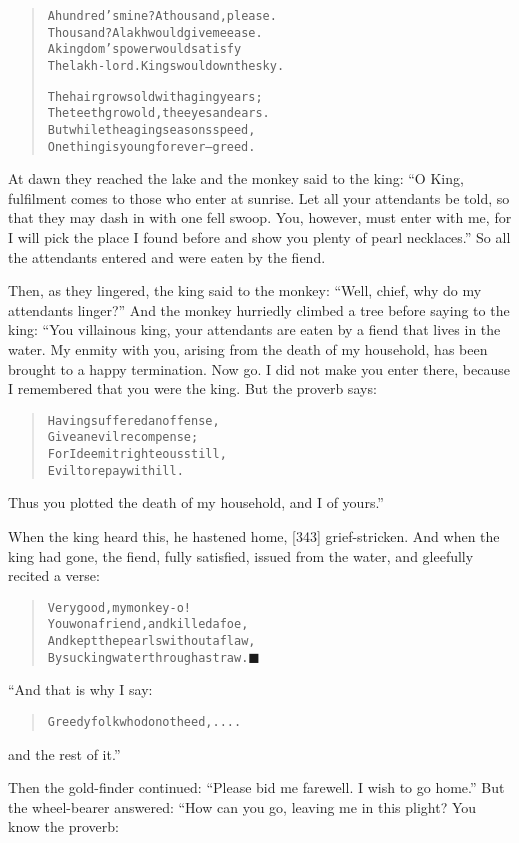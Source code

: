 \documentclass[article, twoside, 14pt]{memoir}
\newcommand{\qed}{\hfill \ensuremath{\blacksquare}}
\renewenvironment{verbatim}{%
\begin{quote}%
\vskip -10pt%
\begin{alltt}\normalfont\large}{\end{alltt}%
\end{quote}%
\vskip -10pt
} %
\begin{document}
\begin{verbatim}
A hundred's mine? A thousand, please.
Thousand? A lakh would give me ease.
A kingdom's power would satisfy
The lakh-lord. Kings would own the sky.

The hair grows old with aging years;
The teeth grow old, the eyes and ears.
But while the aging seasons speed,
One thing is young forever--greed.
\end{verbatim}
At dawn they reached the lake and the monkey said to the king:
``O King, fulfilment comes to those who enter at sunrise. Let all your attendants be told, so that they may dash in with one fell swoop. You, however, must enter with me, for I will pick the place I found before and show you plenty of pearl necklaces.''
So all the attendants entered and were eaten by the fiend.

Then, as they lingered, the king said to the monkey:
``Well, chief, why do my attendants linger?'' And the monkey
hurriedly climbed a tree before saying to the king: “You villainous
king, your attendants are eaten by a fiend that lives in the water.
My enmity with you, arising from the death of my household, has
been brought to a happy termination. Now go. I did not make you
enter there, because I remembered that you were the king. But the
proverb says:

\begin{verbatim}
Having suffered an offense,
Give an evil recompense;
For I deem it righteous still,
Evil to repay with ill.
\end{verbatim}
Thus you plotted the death of my household, and I of yours.”

When the king heard this, he hastened home, [343] grief-stricken.
And when the king had gone, the fiend, fully satisfied, issued from
the water, and gleefully recited a verse:

\begin{verbatim}
Very good, my monkey-o!
You won a friend, and killed a foe,
And kept the pearls without a flaw,
By sucking water through a straw.\hyperref[s87]{\qed}
\end{verbatim}
“And that is why I say:

\begin{verbatim}
Greedy folk who do not heed, ....
\end{verbatim}
and the rest of it.”

Then the gold-finder continued:
``Please bid me farewell. I wish to go home.'' But the wheel-bearer
answered: “How can you go, leaving me in this plight? You know the
proverb:
\end{document}
